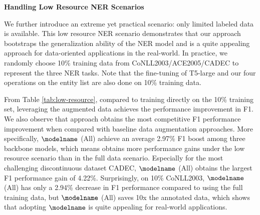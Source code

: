 \noindent\textbf{Handling Low Resource NER Scenarios}

We further introduce an extreme yet practical scenario: only limited labeled data is available. This low resource NER scenario demonstrates that our {\modelname} approach bootstraps the generalization ability of the NER model and is a quite appealing approach for data-oriented applications in the real-world. In practice, we randomly choose 10\% training data from CoNLL2003/ACE2005/CADEC to represent the three NER tasks. Note that the fine-tuning of T5-large and our four operations on the entity list are also done on 10\% training data.

From Table \ref{tab:low-resource}, compared to training directly on the 10\% training set, leveraging the augmented data achieves the performance improvement in F1. We also observe that {\modelname} approach obtains the most competitive F1 performance improvement when compared with baseline data augmentation approaches. 
More specifically, ${\modelname}$ (All) achieve an average 2.97\% F1 boost among three backbone models, which means {\modelname} obtains more performance gains under the low resource scenario than in the full data scenario. Especially for the most challenging discontinuous dataset CADEC, ${\modelname}$ (All) obtains the largest F1 performance gain of 4.22\%.
Surprisingly, on 10\% CoNLL2003, ${\modelname}$ (All) has only a 2.94\% decrease in F1 performance compared to using the full training data, but ${\modelname}$ (All) saves 10x the annotated data, which shows that adopting ${\modelname}$ is quite appealing for real-world applications.
